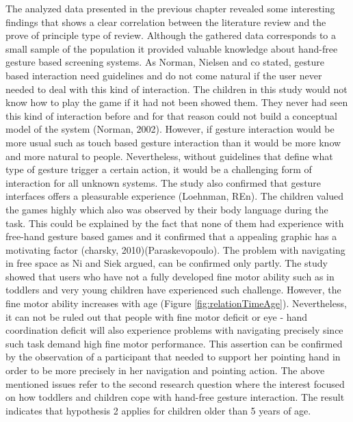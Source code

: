 The analyzed data presented in the previous chapter revealed some interesting findings that shows a clear correlation between the literature review and the prove of principle type of review. Although the gathered data corresponds to a small sample of the population it provided valuable knowledge about hand-free gesture based screening systems. As Norman, Nielsen and co stated, gesture based interaction need guidelines and do not come natural if the user never needed to deal with this kind of interaction. The children in this study would not know how to play the game if it had not been showed them. They never had seen this kind of interaction before and for that reason could not build a conceptual model of the system (Norman, 2002). However, if gesture interaction would be more usual such as touch based gesture interaction than it would be more know and more natural to people. Nevertheless, without guidelines that define what type of gesture trigger a certain action, it would be a challenging form of interaction for all unknown systems. 
The study also confirmed that gesture interfaces offers a pleasurable experience (Loehnman, REn). The children valued the games highly which also was observed by their body language during the task. This could be explained by the fact that none of them had experience with free-hand gesture based games and it confirmed that a appealing graphic has a motivating factor (charsky, 2010)(Paraskevopoulo).
The problem with navigating in free space as Ni and Siek argued, can be confirmed only partly. The study showed that users who have not a fully developed fine motor ability such as in toddlers and very young children have experienced such challenge. However, the fine motor ability increases with age (Figure \ref{fig:relationTimeAge}). Nevertheless, it can not be ruled out that people with fine motor deficit or eye - hand coordination deficit will also experience problems with navigating precisely since such task demand high fine motor performance. This assertion can be confirmed by the observation of a participant that needed to support her pointing hand in order to be more precisely in her navigation and pointing action. 
The above mentioned issues refer to the second research question where the interest focused on how toddlers and children cope with hand-free gesture interaction. The result indicates that hypothesis 2 applies for children older than 5 years of age.


